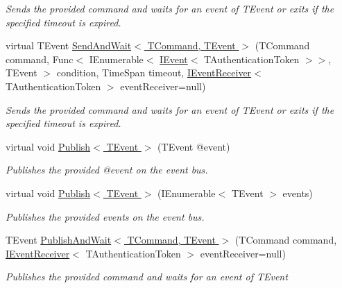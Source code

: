 \begin{DoxyCompactItemize}
\begin{DoxyCompactList}\small\item\em Sends the provided {\itshape command}  and waits for an event of {\itshape T\+Event}  or exits if the specified timeout is expired. \end{DoxyCompactList}\item 
virtual T\+Event \hyperlink{classCqrs_1_1Bus_1_1InProcessBus_aae598cbe7ec6f4238e5a5b966df1157c_aae598cbe7ec6f4238e5a5b966df1157c}{Send\+And\+Wait$<$ T\+Command, T\+Event $>$} (T\+Command command, Func$<$ I\+Enumerable$<$ \hyperlink{interfaceCqrs_1_1Events_1_1IEvent}{I\+Event}$<$ T\+Authentication\+Token $>$$>$, T\+Event $>$ condition, Time\+Span timeout, \hyperlink{interfaceCqrs_1_1Events_1_1IEventReceiver}{I\+Event\+Receiver}$<$ T\+Authentication\+Token $>$ event\+Receiver=null)
\begin{DoxyCompactList}\small\item\em Sends the provided {\itshape command}  and waits for an event of {\itshape T\+Event}  or exits if the specified timeout is expired. \end{DoxyCompactList}\item 
virtual void \hyperlink{classCqrs_1_1Bus_1_1InProcessBus_afd3d41a5f27a985e9d6ccf3f6f77f11a_afd3d41a5f27a985e9d6ccf3f6f77f11a}{Publish$<$ T\+Event $>$} (T\+Event @event)
\begin{DoxyCompactList}\small\item\em Publishes the provided {\itshape @event}  on the event bus. \end{DoxyCompactList}\item 
virtual void \hyperlink{classCqrs_1_1Bus_1_1InProcessBus_ae154f274db2a028a6094677d83cc1c74_ae154f274db2a028a6094677d83cc1c74}{Publish$<$ T\+Event $>$} (I\+Enumerable$<$ T\+Event $>$ events)
\begin{DoxyCompactList}\small\item\em Publishes the provided {\itshape events}  on the event bus. \end{DoxyCompactList}\item 
T\+Event \hyperlink{classCqrs_1_1Bus_1_1InProcessBus_a38c0684e313f42bfb36b40703db94ccb_a38c0684e313f42bfb36b40703db94ccb}{Publish\+And\+Wait$<$ T\+Command, T\+Event $>$} (T\+Command command, \hyperlink{interfaceCqrs_1_1Events_1_1IEventReceiver}{I\+Event\+Receiver}$<$ T\+Authentication\+Token $>$ event\+Receiver=null)
\begin{DoxyCompactList}\small\item\em Publishes the provided {\itshape command}  and waits for an event of {\itshape T\+Event}  \end{DoxyCompactList}\item 
$$
\end{DoxyCompactItemize}
